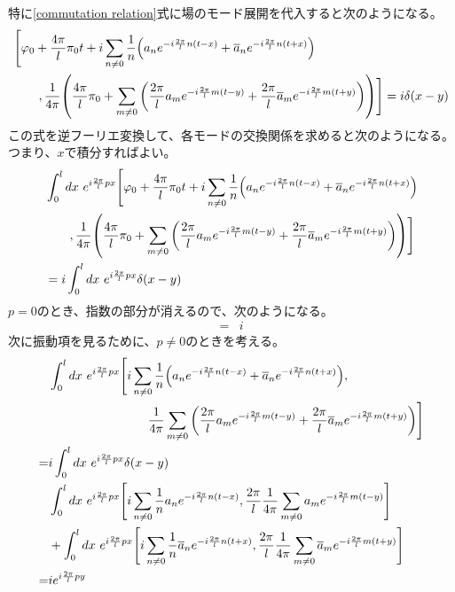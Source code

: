 \documentclass[11pt, dvipdfmx]{article}
\numberwithin{equation}{section}
\begin{document}
特に\eqref{commutation relation}式に場のモード展開を代入すると次のようになる。
\begin{align}
    &\Bigg[\varphi_0+\frac{4\pi}{l}\pi_0 t+i\sum_{n\neq 0}\frac{1}{n}\qty(a_n e^{-i\frac{2\pi}{l}n(t-x)} + \overline{a}_n e^{-i\frac{2\pi}{l}n(t+x)})\\
    &\ \ \ \ \ \ , \frac{1}{4\pi}\qty(\frac{4\pi}{l}\pi_0 + \sum_{m\neq 0}\qty(\frac{2\pi}{l}a_m e^{-i\frac{2\pi}{l}m(t-y)}  +\frac{2\pi }{l}\overline{a}_m e^{-i\frac{2\pi}{l}m(t+y)}))\Bigg]\nonumber
    =i\delta(x-y)
\end{align}
この式を逆フーリエ変換して、各モードの交換関係を求めると次のようになる。
つまり、$x$で積分すればよい。
\begin{align}
    &\int_0^l dx \ e^{i\frac{2\pi}{l}p x}\Bigg[\varphi_0+\frac{4\pi}{l}\pi_0 t+i\sum_{n\neq 0}\frac{1}{n}\qty(a_n e^{-i\frac{2\pi}{l}n(t-x)} + \overline{a}_n e^{-i\frac{2\pi}{l}n(t+x)})\\
    &\ \ \ \ \ \ , \frac{1}{4\pi}\qty(\frac{4\pi}{l}\pi_0 + \sum_{m\neq 0}\qty(\frac{2\pi}{l}a_m e^{-i\frac{2\pi}{l}m(t-y)}  +\frac{2\pi }{l}\overline{a}_m e^{-i\frac{2\pi}{l}m(t+y)}))\Bigg]\nonumber\\
    &=i\int_0^l dx \ e^{i\frac{2\pi}{l}p x}\delta(x-y)\nonumber
\end{align}
$p=0$のとき、指数の部分が消えるので、次のようになる。
\begin{align}
    [\varphi_0 , \pi_0]=&i
\end{align}
次に振動項を見るために、$p\neq 0$のときを考える。
\begin{align}
    &\int_0^l dx \ e^{i\frac{2\pi}{l}p x}\Bigg[i\sum_{n\neq 0}\frac{1}{n}\qty(a_n e^{-i\frac{2\pi}{l}n(t-x)} + \overline{a}_n e^{-i\frac{2\pi}{l}n(t+x)}) ,\nonumber\\
    &\hspace{8em} \frac{1}{4\pi}\sum_{m\neq 0}\qty(\frac{2\pi}{l}a_m e^{-i\frac{2\pi}{l}m(t-y)}  +\frac{2\pi }{l}\overline{a}_m e^{-i\frac{2\pi}{l}m(t+y)})\Bigg]\nonumber\\
    =&i\int_0^l dx \ e^{i\frac{2\pi}{l}p x}\delta(x-y)\\
    &\int_0^l dx \ e^{i\frac{2\pi}{l}p x}\Bigg[i\sum_{n\neq 0}\frac{1}{n} a_n e^{-i\frac{2\pi}{l}n(t-x)} ,\frac{2\pi}{l} \frac{1}{4\pi}\sum_{m\neq 0} a_m e^{-i\frac{2\pi}{l}m(t-y)}\Bigg]\nonumber\\
    &+\int_0^l dx \ e^{i\frac{2\pi}{l}p x}\Bigg[i\sum_{n\neq 0}\frac{1}{n} \overline{a}_n e^{-i\frac{2\pi}{l}n(t+x)} , \frac{2\pi}{l}\frac{1}{4\pi}\sum_{m\neq 0} \overline{a}_m e^{-i\frac{2\pi}{l}m(t+y)}\Bigg]\nonumber\\
    =&i e^{i\frac{2\pi}{l}p y}
\end{align}
\end{document}
